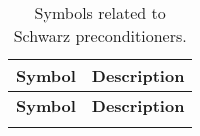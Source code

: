 \begin{longtable}{c p{10cm}}
    \caption{Symbols related to Schwarz preconditioners.}\label{tab:schwarz_symbols}                                                                         \\
    \hline
    \textbf{Symbol}       & \textbf{Description}                                                                                                             \\
    \hline
    \endfirsthead

    \hline
    \textbf{Symbol}       & \textbf{Description}                                                                                                             \\
    \hline
    \endhead

    \hline
    \endfoot

    \hline
    \endlastfoot


\end{longtable}
